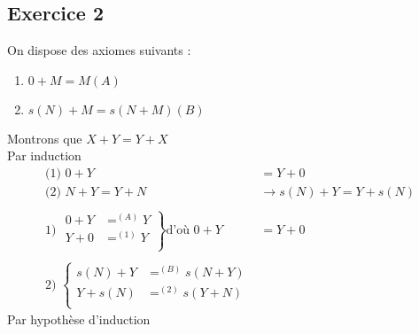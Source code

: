 \documentclass[11pt,a4paper]{article}
\begin{document}
	\subsection{Exercice 2}
	On dispose des axiomes suivants :
	\begin{enumerate}
		\item $0 + M = M (A)$
		\item $s(N) + M = s(N + M) (B)$
	\end{enumerate}
	Montrons que $X + Y = Y + X$\\
	Par induction
	\begin{align*}
		\text{(1) } 0 + Y &= Y + 0\\
		\text{(2) } N + Y = Y + N &\rightarrow s(N) + Y = Y + s(N)\\ \\
		\text{1) }
		\left.
		\begin{array}{rcr}
		0 + Y &=^{(A)} Y\\
		Y + 0 &=^{(1)} Y\\
		\end{array}
		\right\}
		\text{d'où } 0 + Y &= Y + 0\\ \\
		\text{2) }
		\left\{
		\begin{array}{rcr}
		s(N) + Y &=^{(B)} s(N +Y)\\
		Y + s(N) &=^{(2)} s(Y + N)\\
		\end{array}
		\right.
	\end{align*}
	Par hypothèse d'induction
	
\end{document}
